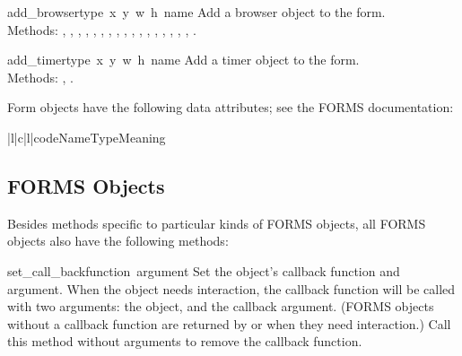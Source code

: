 \begin{flushleft}
\begin{funcdesc}{add_browser}{type\, x\, y\, w\, h\, name}
Add a browser object to the form. \\
Methods:
,
,
,
,
,
,
,
,
,
,
,
,
,
,
,
,
,
.
\end{funcdesc}


\begin{funcdesc}{add_timer}{type\, x\, y\, w\, h\, name}
Add a timer object to the form. \\
Methods:
,
.
\end{funcdesc}
\end{flushleft}

Form objects have the following data attributes; see the FORMS
documentation:

\begin{tableiii}{|l|c|l|}{code}{Name}{Type}{Meaning}
\end{tableiii}

\subsection{FORMS Objects}

Besides methods specific to particular kinds of FORMS objects, all
FORMS objects also have the following methods:

\renewcommand{\indexsubitem}{(FORMS object method)}
\begin{funcdesc}{set_call_back}{function\, argument}
Set the object's callback function and argument.  When the object
needs interaction, the callback function will be called with two
arguments: the object, and the callback argument.  (FORMS objects
without a callback function are returned by  or
 when they need interaction.)  Call this method
without arguments to remove the callback function.
\end{funcdesc}

